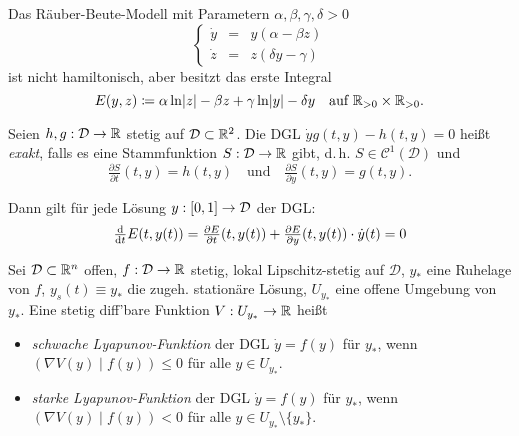\documentclass{cheat-sheet}
\newcommand{\D}{\mathcal{D}}
\newcommand{\scp}[2]{\left( #1 \!\mid\! #2 \right)} %
\begin{document}

\begin{bsp}
  Das Räuber-Beute-Modell mit Parametern $\alpha, \beta, \gamma, \delta > 0$
  \[
    \left\{ \begin{array}{lll}
      \dot{y} &= & y (\alpha - \beta z) \\
      \dot{z} &= & z (\delta y - \gamma)
    \end{array} \right.
  \]
  ist nicht hamiltonisch, aber besitzt das erste Integral
  \[
    E(y, z) \coloneqq \alpha \ln \lvert z\rvert - \beta z + \gamma \ln \lvert y\rvert - \delta y
    \quad \text{auf } \mathbb{R}_{>0} \times \mathbb{R}_{>0}.
  \]
\end{bsp}

\begin{defn}
  Seien $h, g : \D \to \R$ stetig auf $\D \subset \R^2$. Die DGL $\dot{y} g(t, y) - h(t, y) = 0$ heißt \emph{exakt}, falls es eine Stammfunktion $S : \D \to \R$ gibt, d.\,h. $S \in \mathcal{C}^1(\D)$ und
  \[
    \tfrac{\partial S}{\partial t} (t, y) = h(t, y)
    \quad \text{und} \quad
    \tfrac{\partial S}{\partial y} (t, y) = g(t, y).
  \]
\end{defn}

\begin{bem}
  Dann gilt für jede Lösung $y : \I \to \D$ der DGL:
  \[
    \tfrac{\d}{\d t} E(t, y(t)) = \tfrac{\partial E}{\partial t} (t, y(t)) + \tfrac{\partial E}{\partial y} (t, y(t)) \cdot \dot{y}(t) = 0 %
  \]
\end{bem}


\begin{defn}
  Sei $\D \subset \R^n$ offen, $f : \D \to \R$ stetig, lokal Lipschitz-stetig auf $\D$, $y_{*}$ eine Ruhelage von $f$, $y_s(t) \equiv y_{*}$ die zugeh. stationäre Lösung, $U_{y_{*}}$ eine offene Umgebung von $y_{*}$. Eine stetig diff'bare Funktion $V : U_{y_{*}} \to \mathbb{R}$ heißt
  \begin{itemize}
    \item \emph{schwache Lyapunov-Funktion} der DGL $\dot{y} = f(y)$ für $y_{*}$, wenn $\scp{\nabla V(y)}{f(y)} \leq 0$ für alle $y \in U_{y_{*}}$.
    \item \emph{starke Lyapunov-Funktion} der DGL $\dot{y} = f(y)$ für $y_{*}$, wenn $\scp{\nabla V(y)}{f(y)} < 0$ für alle $y \in U_{y_{*}} \setminus \{ y_{*} \}$.
  \end{itemize}
\end{defn}
\end{document}
